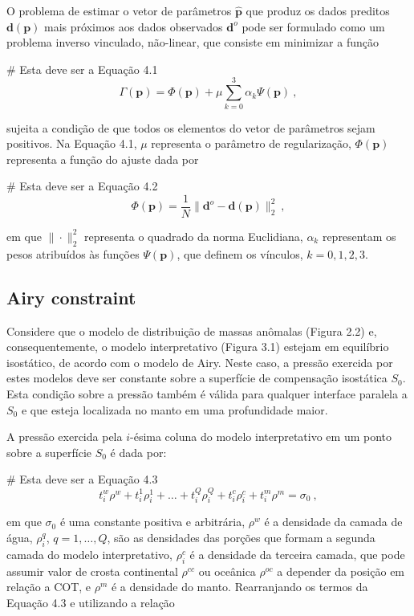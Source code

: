 \documentclass[manuscript]{geophysics}
\begin{document}
O problema de estimar o vetor de parâmetros $\hat{\mathbf{p}}$ que produz os dados preditos $\mathbf{d}(\mathbf{p})$ mais próximos aos dados observados $\mathbf{d}^{o}$ pode ser formulado como um problema inverso vinculado, não-linear, que consiste em minimizar a função

# Esta deve ser a Equação 4.1
\begin{equation}
\Gamma (\mathbf{p}) = \Phi(\mathbf{p}) + \mu \sum_{k = 0}^{3} \alpha_{k} \Psi(\mathbf{p}) \: ,
\end{equation}

sujeita a condição de que todos os elementos do vetor de parâmetros sejam positivos. Na Equação 4.1, $\mu$ representa o parâmetro de regularização, $\Phi(\mathbf{p})$ representa a função do ajuste dada por

# Esta deve ser a Equação 4.2
\begin{equation}
\Phi(\mathbf{p}) = \frac{1}{N} \| \mathbf{d}^{o} - \mathbf{d}(\mathbf{p}) \|_{2}^{2} \: , 
\end{equation}

em que $\| \cdot \|_{2}^{2}$ representa o quadrado da norma Euclidiana, $\alpha_{k}$ representam os pesos atribuídos às funções $\Psi(\mathbf{p})$, que definem os vínculos, $k = 0, 1, 2, 3$.

\subsection{Airy constraint}

Considere que o modelo de distribuição de massas anômalas (Figura 2.2) e, consequentemente, o modelo interpretativo (Figura 3.1) estejam em equilíbrio isostático, de acordo com o modelo de Airy. Neste caso, a pressão exercida por estes modelos deve ser constante sobre a superfície de compensação isostática $S_{0}$. Esta condição sobre a pressão também é válida para qualquer interface paralela a $S_{0}$ e que esteja localizada no manto em uma profundidade maior.

A pressão exercida pela $i$-ésima coluna do modelo interpretativo em um ponto sobre a superfície $S_{0}$ é dada por:

# Esta deve ser a Equação 4.3
\begin{equation}
t^{w}_{i} \rho^{w} + t^{1}_{i} \rho^{1}_{i} + \dots + t^{Q}_{i} \rho^{Q}_{i} + t^{c}_{i} \rho^{c}_{i} + t^{m}_{i} \rho^{m} = \sigma_{0} \: ,
\end{equation}

em que $\sigma_{0}$ é uma constante positiva e arbitrária,  $\rho^{w}$ é a densidade da camada de água, $\rho^{q}_{i}$, $q = 1, \dots, Q$, são as densidades das porções que formam a segunda camada do modelo interpretativo, $\rho^{c}_{i}$ é a densidade da terceira camada, que pode assumir valor de crosta continental $\rho^{cc}$ ou oceânica $\rho^{oc}$ a depender da posição em relação a COT, e  $\rho^{m}$ é a densidade do manto. Rearranjando os termos da Equação 4.3 e utilizando a relação 
\end{document}
